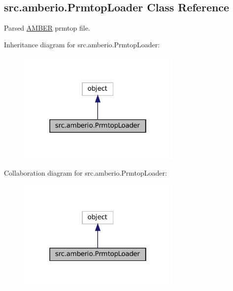 \hypertarget{classsrc_1_1amberio_1_1PrmtopLoader}{}\subsection{src.\+amberio.\+Prmtop\+Loader Class Reference}
\label{classsrc_1_1amberio_1_1PrmtopLoader}


Parsed \hyperlink{classsrc_1_1amberio_1_1AMBER}{A\+M\+B\+ER} prmtop file.  




Inheritance diagram for src.\+amberio.\+Prmtop\+Loader\+:
\nopagebreak
\begin{figure}[H]
\begin{center}
\leavevmode
\includegraphics[width=226pt]{classsrc_1_1amberio_1_1PrmtopLoader__inherit__graph}
\end{center}
\end{figure}


Collaboration diagram for src.\+amberio.\+Prmtop\+Loader\+:
\nopagebreak
\begin{figure}[H]
\begin{center}
\leavevmode
\includegraphics[width=226pt]{classsrc_1_1amberio_1_1PrmtopLoader__coll__graph}
\end{center}
\end{figure}
